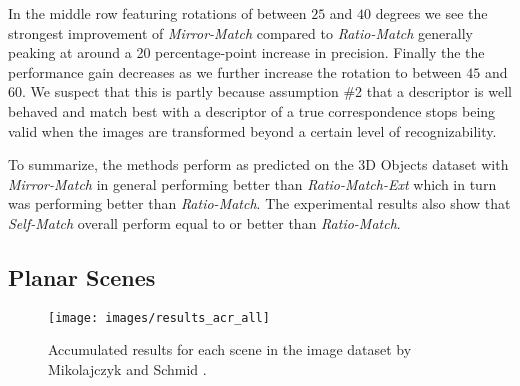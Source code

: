 \documentclass[journal]{IEEEtran}
\begin{document}
In the middle row featuring rotations of between $25$ and $40$ degrees 
we see the strongest improvement of \emph{Mirror-Match} compared to 
\emph{Ratio-Match} generally peaking at around
a 20 percentage-point increase in precision. Finally the the performance
gain decreases as we further increase the rotation to between $45$ and 
$60$. We suspect that this is partly because assumption \#2 that a 
descriptor is well behaved and match best with a descriptor of a true 
correspondence stops being valid when the images are transformed beyond 
a certain level of recognizability.

To summarize, the methods perform as predicted on the 3D Objects dataset
with \emph{Mirror-Match} in general performing better than 
\emph{Ratio-Match-Ext} which in turn was performing better than 
\emph{Ratio-Match}. The experimental results also show that 
\emph{Self-Match} overall perform equal to or better than 
\emph{Ratio-Match}.

\subsection{Planar Scenes}
\label{S:Planar}

\begin{figure*}[t!]
	\centering
    \texttt{[image: images/results\_acr\_all]}
    \caption{Accumulated results for each scene in the image dataset by 
    Mikolajczyk and Schmid \cite{mikolajczyk2005performance}.}
    \label{fig:acr_objects}
\end{figure*}
\end{document}
